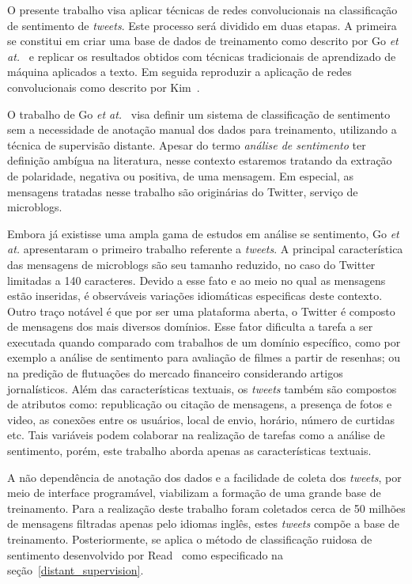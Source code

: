 
O presente trabalho visa aplicar técnicas de redes convolucionais na classificação de sentimento de \textit{tweets}.
Este processo será dividido em duas etapas.
A primeira se constitui em criar uma base de dados de treinamento como descrito por Go \textit{et at.}~\cite{go09} e
replicar os resultados obtidos com técnicas tradicionais de aprendizado de máquina aplicados a texto.
Em seguida reproduzir a aplicação de redes convolucionais como descrito por Kim~\cite{kim14}.

O trabalho de Go \textit{et at.}~\cite{go09} visa definir um sistema de classificação de sentimento sem a necessidade de
anotação manual dos dados para treinamento, utilizando a técnica de supervisão distante.
Apesar do termo \textit{análise de sentimento} ter definição ambígua na literatura, nesse contexto estaremos tratando da
extração de polaridade, negativa ou positiva, de uma mensagem.
Em especial, as mensagens tratadas nesse trabalho são originárias do Twitter, serviço de microblogs.

Embora já existisse uma ampla gama de estudos em análise se sentimento, Go \textit{et at.} apresentaram o primeiro
trabalho referente a \textit{tweets}.
A principal característica das mensagens de microblogs são seu tamanho reduzido, no caso do Twitter limitadas a
140 caracteres.
Devido a esse fato e ao meio no qual as mensagens estão inseridas, é observáveis variações idiomáticas especificas deste
contexto.
Outro traço notável é que por ser uma plataforma aberta, o Twitter é composto de mensagens dos mais diversos domínios.
Esse fator dificulta a tarefa a ser executada quando comparado com trabalhos de um domínio específico, como por exemplo
a análise de sentimento para avaliação de filmes a partir de resenhas; ou na predição de flutuações do mercado financeiro
considerando artigos jornalísticos.
Além das características textuais, os \textit{tweets} também são compostos de atributos como: republicação ou citação de
mensagens, a presença de fotos e video, as conexões entre os usuários, local de envio, horário, número de curtidas etc.
Tais variáveis podem colaborar na realização de tarefas como a análise de sentimento, porém, este trabalho aborda apenas
as características textuais.

A não dependência de anotação dos dados e a facilidade de coleta dos \textit{tweets}, por meio de interface programável,
viabilizam a formação de uma grande base de treinamento.
Para a realização deste trabalho foram coletados cerca de 50 milhões de mensagens filtradas apenas pelo idiomas inglês,
estes \textit{tweets} compõe a base de treinamento.
Posteriormente, se aplica o método de classificação ruidosa de sentimento desenvolvido por Read~\cite{read05} como
especificado na seção~\ref{distant_supervision}.

